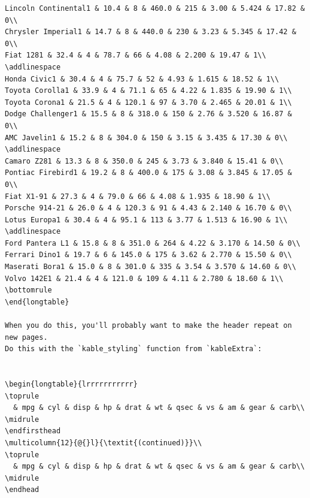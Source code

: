 \documentclass[a4paper, nobind]{templates/ociamthesis}
\begin{document}
\begin{verbatim}
Lincoln Continental1 & 10.4 & 8 & 460.0 & 215 & 3.00 & 5.424 & 17.82 & 0\\
Chrysler Imperial1 & 14.7 & 8 & 440.0 & 230 & 3.23 & 5.345 & 17.42 & 0\\
Fiat 1281 & 32.4 & 4 & 78.7 & 66 & 4.08 & 2.200 & 19.47 & 1\\
\addlinespace
Honda Civic1 & 30.4 & 4 & 75.7 & 52 & 4.93 & 1.615 & 18.52 & 1\\
Toyota Corolla1 & 33.9 & 4 & 71.1 & 65 & 4.22 & 1.835 & 19.90 & 1\\
Toyota Corona1 & 21.5 & 4 & 120.1 & 97 & 3.70 & 2.465 & 20.01 & 1\\
Dodge Challenger1 & 15.5 & 8 & 318.0 & 150 & 2.76 & 3.520 & 16.87 & 0\\
AMC Javelin1 & 15.2 & 8 & 304.0 & 150 & 3.15 & 3.435 & 17.30 & 0\\
\addlinespace
Camaro Z281 & 13.3 & 8 & 350.0 & 245 & 3.73 & 3.840 & 15.41 & 0\\
Pontiac Firebird1 & 19.2 & 8 & 400.0 & 175 & 3.08 & 3.845 & 17.05 & 0\\
Fiat X1-91 & 27.3 & 4 & 79.0 & 66 & 4.08 & 1.935 & 18.90 & 1\\
Porsche 914-21 & 26.0 & 4 & 120.3 & 91 & 4.43 & 2.140 & 16.70 & 0\\
Lotus Europa1 & 30.4 & 4 & 95.1 & 113 & 3.77 & 1.513 & 16.90 & 1\\
\addlinespace
Ford Pantera L1 & 15.8 & 8 & 351.0 & 264 & 4.22 & 3.170 & 14.50 & 0\\
Ferrari Dino1 & 19.7 & 6 & 145.0 & 175 & 3.62 & 2.770 & 15.50 & 0\\
Maserati Bora1 & 15.0 & 8 & 301.0 & 335 & 3.54 & 3.570 & 14.60 & 0\\
Volvo 142E1 & 21.4 & 4 & 121.0 & 109 & 4.11 & 2.780 & 18.60 & 1\\
\bottomrule
\end{longtable}

When you do this, you'll probably want to make the header repeat on new pages.
Do this with the `kable_styling` function from `kableExtra`:


\begin{longtable}{lrrrrrrrrrrr}
\toprule
  & mpg & cyl & disp & hp & drat & wt & qsec & vs & am & gear & carb\\
\midrule
\endfirsthead
\multicolumn{12}{@{}l}{\textit{(continued)}}\\
\toprule
  & mpg & cyl & disp & hp & drat & wt & qsec & vs & am & gear & carb\\
\midrule
\endhead


\end{verbatim}
\end{document}
